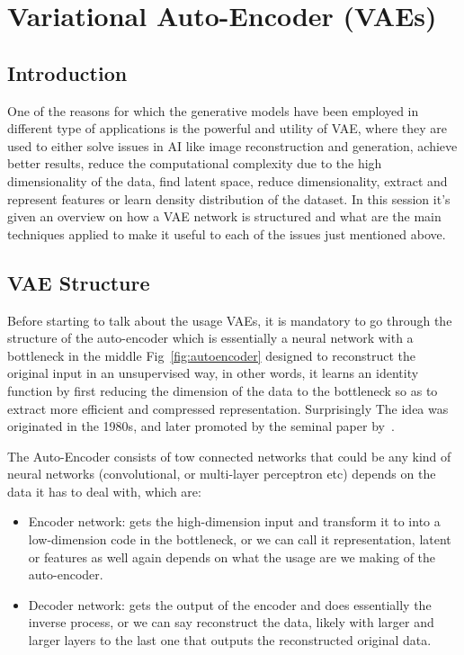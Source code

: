 

\pagestyle{fancy} 
\chapter{Variational Auto-Encoder (VAEs)}
\label{cha:1}
\vspace{1cm}


\section{Introduction}
\label{sec:}
One of the reasons for which the generative models have been employed in different type of applications is the powerful and utility of VAE, where they are used to either solve issues in AI like image reconstruction and generation, achieve better results, reduce the computational complexity due to the high dimensionality of the data, find latent space, reduce dimensionality, extract and represent features or learn density distribution of the dataset. In this session it’s given an overview on how a VAE network is structured and what are the main techniques applied to make it useful to each of the issues just mentioned above.
\vspace{0.3cm}

\section{VAE Structure}
Before starting to talk about the usage VAEs, it is mandatory to go through the structure of the auto-encoder which is essentially a neural network with a bottleneck in the middle Fig~\ref{fig:autoencoder} designed to reconstruct the original input in an unsupervised way, in other words, it learns an identity function by first reducing the dimension of the data to the bottleneck so as to extract more efficient and compressed representation. Surprisingly The idea was originated in the 1980s, and later promoted by the seminal paper by~\cite{hinton2006reducing}.

\vspace{0.3cm}
The Auto-Encoder consists of tow connected networks that could be any kind of neural networks (convolutional, or multi-layer perceptron etc) depends on the data it has to deal with, which are:
\begin{itemize}
	\item Encoder network: gets the high-dimension input and transform it to into a low-dimension code in the bottleneck, or we can call it representation, latent or features as well again depends on what the usage are we making of the auto-encoder.
	\item Decoder network: gets the output of the encoder and does essentially the inverse process, or we can say reconstruct the data, likely with larger and larger layers to the last one that outputs the reconstructed original data.
\end{itemize}

